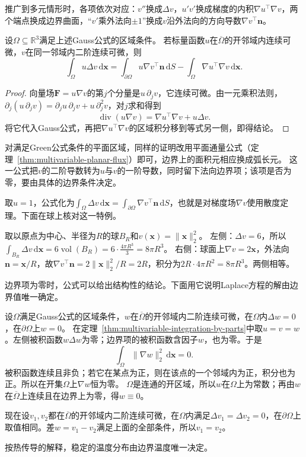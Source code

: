 推广到多元情形时，各项依次对应：$v''$换成$\Delta v$，$u'v'$换成梯度的内积$\nabla u^\top\nabla v$，两个端点换成边界曲面，“$v'$乘外法向$\pm1$”换成$v$沿外法向的方向导数$\nabla v^\top\bm n$。
\begin{theorem}[多元分部积分]
\label{thm:multivariable-integration-by-parts}
设$\Omega\subseteq\mathbb R^3$满足上述Gauss公式的区域条件。
若标量函数$u$在$\overline\Omega$的开邻域内连续可微，$v$在同一邻域内二阶连续可微，则
\[
 \int_\Omega u\Delta v\,\mathrm d\bm x
 =\int_{\partial\Omega}u\nabla v^\top\bm n\,\mathrm dS
  -\int_\Omega\nabla u^\top\nabla v\,\mathrm d\bm x.
\]
\end{theorem}
\begin{proof}
向量场$\bm F=u\nabla v$的第$j$个分量是$u\,\partial_jv$，它连续可微。由一元乘积法则，
$\partial_j(u\,\partial_jv)=\partial_ju\,\partial_jv+u\,\partial_j^2v$，对$j$求和得到
\[
 \operatorname{div}(u\nabla v)
 =\nabla u^\top\nabla v+u\Delta v.
\]
将它代入Gauss公式，再把$\nabla u^\top\nabla v$的区域积分移到等式另一侧，即得结论。
\end{proof}
对满足Green公式条件的平面区域，同样的证明改用平面通量公式（定理~\ref{thm:multivariable-planar-flux}）即可，边界上的面积元相应换成弧长元。
这一公式把$v$的二阶导数转为$u$与$v$的一阶导数，同时留下法向边界项；该项是否为零，要由具体的边界条件决定。

取$u=1$，公式化为$\int_\Omega\Delta v\,\mathrm d\bm x=\int_{\partial\Omega}\nabla v^\top\bm n\,\mathrm dS$，也就是对梯度场$\nabla v$使用散度定理。下面在球上核对这一特例。
\begin{example}[球上平方范数的Laplace积分]
取以原点为中心、半径为$R$的球$B_R$和$v(\bm x)=\lVert\bm x\rVert_2^2$。
左侧：$\Delta v=6$，所以$\int_{B_R}\Delta v\,\mathrm d\bm x=6\operatorname{vol}(B_R)=6\cdot\frac{4\pi R^3}3=8\pi R^3$。
右侧：球面上$\nabla v=2\bm x$，外法向$\bm n=\bm x/R$，故$\nabla v^\top\bm n=2\lVert\bm x\rVert_2^2/R=2R$，积分为$2R\cdot4\pi R^2=8\pi R^3$。两侧相等。
\end{example}

边界项为零时，公式可以给出结构性的结论。下面用它说明Laplace方程的解由边界值唯一确定。
\begin{example}[Laplace方程的解由边界值决定]
设$\Omega$满足Gauss公式的区域条件，$w$在$\overline\Omega$的开邻域内二阶连续可微，在$\Omega$内$\Delta w=0$，在$\partial\Omega$上$w=0$。
在定理~\ref{thm:multivariable-integration-by-parts}中取$u=v=w$。左侧被积函数$w\Delta w$为零；边界项的被积函数含因子$w$，也为零。于是
\[
 \int_\Omega\lVert\nabla w\rVert_2^2\,\mathrm d\bm x=0.
\]
被积函数连续且非负；若它在某点为正，则在该点的一个邻域内为正，积分也为正。所以在开集$\Omega$上$\nabla w$恒为零。
$\Omega$是连通的开区域，所以$w$在$\Omega$上为常数；再由$w$在$\overline\Omega$上连续且在边界上为零，得$w\equiv0$。

现在设$v_1,v_2$都在$\overline\Omega$的开邻域内二阶连续可微，在$\Omega$内满足$\Delta v_1=\Delta v_2=0$，在$\partial\Omega$上取值相同。差$w=v_1-v_2$满足上面的全部条件，所以$v_1=v_2$。
\end{example}
按热传导的解释，稳定的温度分布由边界温度唯一决定。

